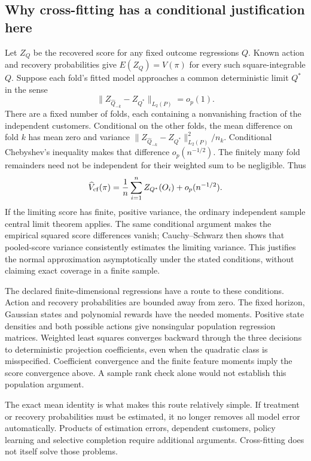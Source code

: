 \subsection{Why cross-fitting has a conditional justification here}
Let $Z_Q$ be the recovered score for any fixed outcome regressions $Q$.
Known action and recovery probabilities give $E(Z_Q)=V(\pi)$ for every
such square-integrable $Q$. Suppose each fold's fitted model approaches a
common deterministic limit $Q^*$ in the sense
\[
\|Z_{\widehat Q_{-k}}-Z_{Q^*}\|_{L_2(P)}=o_p(1).
\]
There are a fixed number of folds, each containing a nonvanishing fraction
of the independent customers. Conditional on the other folds, the mean
difference on fold $k$ has mean zero and variance
$\|Z_{\widehat Q_{-k}}-Z_{Q^*}\|_{L_2(P)}^2/n_k$.
Conditional Chebyshev's inequality makes that difference
$o_p(n^{-1/2})$. The finitely many fold remainders need not be independent
for their weighted sum to be negligible. Thus
\[
\widehat V_{\rm cf}(\pi)
=\frac{1}{n}\sum_{i=1}^{n} Z_{Q^*}(O_i)+o_p(n^{-1/2}).
\]
If the limiting score has finite, positive variance, the ordinary independent
sample central limit theorem applies. The same conditional argument makes
the empirical squared score differences vanish; Cauchy--Schwarz then shows
that pooled-score variance consistently estimates the limiting variance.
This justifies the normal approximation asymptotically under the stated
conditions, without claiming exact coverage in a finite sample.

The declared finite-dimensional regressions have a route to these conditions.
Action and recovery probabilities are bounded away from zero. The fixed
horizon, Gaussian states and polynomial rewards have the needed moments.
Positive state densities and both possible actions give nonsingular
population regression matrices. Weighted least squares converges backward
through the three decisions to deterministic projection coefficients, even
when the quadratic class is misspecified. Coefficient convergence and the
finite feature moments imply the score convergence above. A sample rank
check alone would not establish this population argument.

The exact mean identity is what makes this route relatively simple. If
treatment or recovery probabilities must be estimated, it no longer removes
all model error automatically. Products of estimation errors, dependent
customers, policy learning and selective completion require additional
arguments. Cross-fitting does not itself solve those problems.

